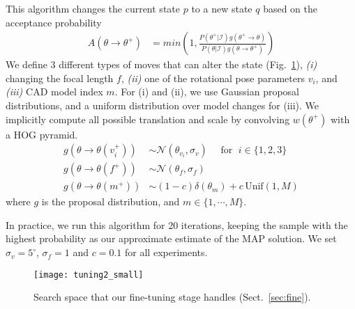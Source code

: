 This algorithm changes the current state $p$ to a new state $q$ based
on the acceptance probability
\begin{align}
    A(\theta \rightarrow \theta^+) & =  min\left( 1, \frac{P(\theta^+ |
            \mathcal{I}) g(\theta^+ \rightarrow \theta)}{P(\theta | \mathcal{I})
            g(\theta \rightarrow \theta^+)}\right)
\end{align}
We define $3$ different types of moves that can alter the state
(Fig.~\ref{fig:moves}), {\em (i)} changing the focal length $f$, {\em
(ii)} one of the rotational pose parameters $v_i$, and {\em (iii)} CAD model
index $m$. For (i) and (ii), we use Gaussian proposal distributions, and a
uniform distribution over model changes for (iii). We implicitly compute all
possible translation and scale by convolving $w(\theta^+)$ with a HOG pyramid.
\begin{align}
    g(\theta \rightarrow \theta(v_i^+)) & \sim
    \mathcal{N}(\theta_{v_i},\sigma_v) \quad \mbox{ for }\; i \in \{1,2,3\}\\
    g(\theta \rightarrow \theta(f^+)) & \sim \mathcal{N}(\theta_{f}, \sigma_f)\\
    g(\theta \rightarrow \theta(m^+)) & \sim (1-c) \delta(\theta_m) +
    c\,\textrm{Unif}(1,M)
\end{align}
where $g$ is the proposal distribution, and $m \in \{1,\cdots,M\}$. 
%

In practice, we run this algorithm for 20 iterations, keeping
the sample with the highest probability as our approximate estimate of
the MAP solution. We set $\sigma_v = 5^\circ$, $\sigma_f = 1$ and
$c = 0.1$ for all experiments.

\begin{figure}[t]
\centering
    \texttt{[image: tuning2\_small]} \\ [-5pt]
    \caption{Search space that our fine-tuning stage handles (Sect.~\ref{sec:fine}).}
 \label{fig:moves}
\end{figure}


